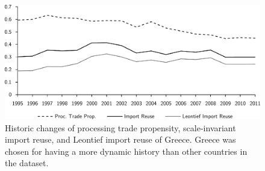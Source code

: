 \documentclass[english]{uzhpub}
\renewcommand{\baselinestretch}{1.5}
\begin{document}
\begin{figure}
\centering
\includegraphics[scale=0.6]{../results/reusedrivers-processing-trade-greece}
\caption{Historic changes of processing trade propensity, scale-invariant import reuse, and Leontief import reuse of Greece. Greece was chosen for having a more dynamic history than other countries in the dataset.} \label{fig:reusedrivers-processing-trade-greece}
\end{figure}


\renewcommand{\baselinestretch}{1.0}
\end{document}
